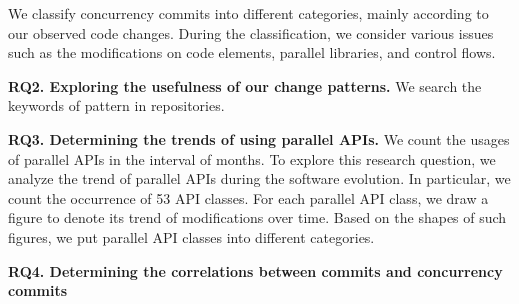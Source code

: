 We classify concurrency commits into different categories, mainly according to our observed code changes. During the classification, we consider various issues such as the modifications on code elements, parallel libraries, and control flows.

\textbf{RQ2. Exploring the usefulness of our change patterns.} We search the keywords of pattern in repositories. 


\textbf{RQ3. Determining the trends of using parallel APIs.} We count the usages of parallel APIs in the interval of months.   To explore this research question, we analyze the trend of parallel APIs during the software evolution. In particular, we count the occurrence of 53 API classes.  For each parallel API class, we draw a figure to denote its trend of modifications over time. Based on the shapes of such figures, we put parallel API classes into different categories. 

\textbf{RQ4. Determining the correlations between commits and concurrency commits} 





